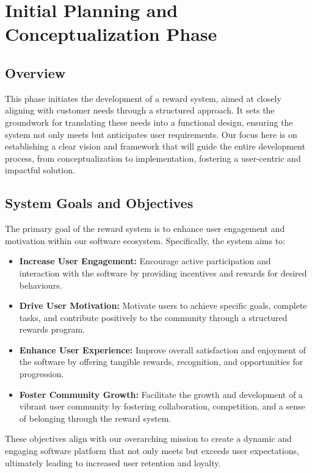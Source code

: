 \section{Initial Planning and Conceptualization Phase}

\subsection{Overview}
This phase initiates the development of a reward system, aimed at closely aligning with customer needs through a structured approach. It sets the groundwork for translating these needs into a functional design, ensuring the system not only meets but anticipates user requirements. Our focus here is on establishing a clear vision and framework that will guide the entire development process, from conceptualization to implementation, fostering a user-centric and impactful solution.

\subsection*{System Goals and Objectives}
The primary goal of the reward system is to enhance user engagement and motivation within our software ecosystem. Specifically, the system aims to:
\begin{itemize}
    \item \textbf{Increase User Engagement:} Encourage active participation and interaction with the software by providing incentives and rewards for desired behaviours.
    \item \textbf{Drive User Motivation:} Motivate users to achieve specific goals, complete tasks, and contribute positively to the community through a structured rewards program.
    \item \textbf{Enhance User Experience:} Improve overall satisfaction and enjoyment of the software by offering tangible rewards, recognition, and opportunities for progression.
    \item \textbf{Foster Community Growth:} Facilitate the growth and development of a vibrant user community by fostering collaboration, competition, and a sense of belonging through the reward system.
\end{itemize}
These objectives align with our overarching mission to create a dynamic and engaging software platform that not only meets but exceeds user expectations, ultimately leading to increased user retention and loyalty.


